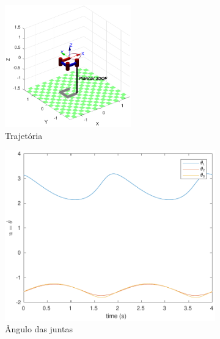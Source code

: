 \documentclass[a4paper,11pt]{article}
\theoremstyle{mytheor}
\begin{document}
\begin{figure}[!ht]
\centering
  \begin{minipage}{\linewidth}
  \centering
    \begin{subfigure}[b]{1\textwidth}
    \centering
    \includegraphics[width=0.6\textwidth]{figs/ex2_2a_traj.pdf}
    \caption{Trajetória}
    \label{fig:ex2_2a_traj}
    \end{subfigure}
  \end{minipage}
  \begin{minipage}{\linewidth}
  \centering
    \begin{subfigure}[b]{0.49\textwidth}
    \includegraphics[width=1\textwidth]{figs/ex2_2a_q.pdf}
    \caption{Ângulo das juntas}
    \label{fig:ex2_2a_q}
    \end{subfigure}
    \begin{subfigure}[b]{0.49\textwidth}

\end{subfigure}
\end{minipage}
\end{figure}
\end{document}
